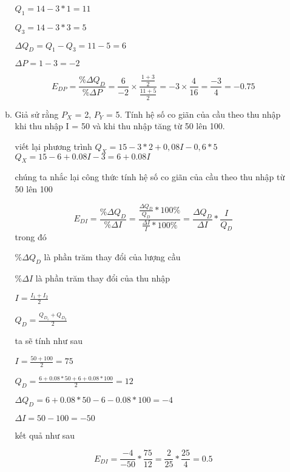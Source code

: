 \begin{enumerate}
\begin{enumerate}[a.]
                $Q_1 = 14 - 3 * 1 = 11$

                $Q_3 = 14 - 3 * 3 = 5$

                $\Delta Q_D = Q_1 - Q_3 = 11 - 5 = 6$

                $\Delta P = 1 - 3 = -2$

                \[ E_{DP} = \frac{\%\Delta Q_D}{\%\Delta P} =
                  \frac{6}{-2}  \times
                  \frac{\frac{1 + 3}{2}}{\frac{11 + 5}{2}} =
                  -3  \times
                  \frac{4}{16} = \frac{-3}{4} = -0.75
                \]

          \item Giả sử rằng $P_X$ = 2, $P_Y$ = 5. Tính hệ số co giãn của cầu theo thu nhập khi thu nhập I =  50 và khi thu nhập tăng từ 50 lên 100.

                viết lại phương trình  $Q_X = 15 - 3 * 2 + 0,08I - 0,6 * 5$ \\
                $Q_X = 15 - 6 + 0.08I - 3 = 6 + 0.08I$

                chúng ta nhắc lại công thức tính hệ số co giãn của cầu theo thu nhập từ 50 lên 100

                \[ E_{DI} =
                  \frac{\% \Delta Q_D}{\% \Delta I}
                  = \frac{\frac{\Delta Q_D}{Q_D} * 100 \% }{\frac{\Delta I}{I} * 100 \% }
                  = \frac{\Delta Q_D}{\Delta I} * \frac{I}{Q_D}
                \]
                trong đó

                $\% \Delta Q_D$ là phần trăm thay đổi của lượng cầu

                $\% \Delta I$ là phần trăm thay đổi của thu nhập

                $ I = \frac{I_1 + I_2}{2}$

                $ Q_D = \frac{Q_{D_1} + Q_{D_2}}{2}$


                ta sẽ tính như sau

                $ I = \frac{50 + 100}{2} = 75$

                $ Q_D = \frac{6 + 0.08 * 50  + 6 + 0.08 * 100}{2} = 12$

                $\Delta Q_D = 6 + 0.08 * 50  - 6 - 0.08 * 100 = -4$

                $\Delta I = 50 - 100= -50$

                kết quả như sau

                \[ E_{DI} = \frac{-4}{-50} * \frac{75}{12} = \frac{2}{25} * \frac{25}{4} = 0.5  \]


\end{enumerate}
\end{enumerate}
